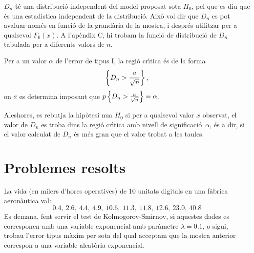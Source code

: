 $D_n$ t\'e una distribuci\'o independent del model proposat sota $H_0$, 
pel que es diu que \'es una estad\'{\i}stica independent de la distribuci\'o. 
Aix\`o vol dir que $D_n$ es pot avaluar nom\'es en funci\'o de la grand\`aria de la 
mostra, i despr\'es utilitzar per a qualsevol $F_0(x)$. A l'ap\`endix C, hi 
trobam la funci\'o de distribuci\'o de $D_n$ tabulada per a diferents valors de $n$.

Per a un valor $\alpha$ de l'error de tipus I, 
la regi\'o cr\'{\i}tica \'es de la forma
$$\left\{ D_n > {a \over \sqrt{n}} \right\},$$
on $a$ es determina imposant que $p\left\{D_n > {a \over \sqrt{n}}\right\} = \alpha$.

Aleshores, es rebutja la hip\`otesi nu{\lgem}a $H_0$ 
si per a qualsevol valor $x$
observat, el valor de $D_n$ es troba dins la regi\'o cr\'{\i}tica 
amb nivell de significaci\'o~$\alpha$, 
\'es a dir, si el valor calculat de $D_n$ \'es m\'es gran que el
valor trobat a les taules.

\section{Problemes resolts}

\begin{probres}
{La vida (en milers d'hores operatives) de 10 unitats digitals
en una f\`abrica aeron\`autica val:
$$0.4,\ 2.6,\ 4.4,\ 4.9,\ 10.6,\ 11.3,\ 11.8,\ 12.6,\ 23.0,\ 40.8$$
Es demana, fent servir el test de Kolmogorov-Smirnov, si aquestes dades es
corresponen amb una variable exponencial amb par\`ametre $\lambda =0.1$, o 
sigui, trobau l'error tipus m\`axim per sota del qual acceptam que la 
mostra anterior correspon a una variable aleat\`oria exponencial.}
\end{probres}

